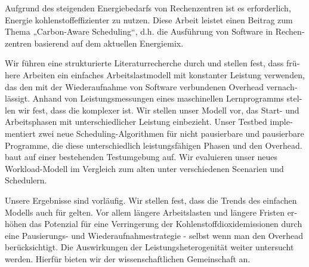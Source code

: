 \null\vfil
\begin{otherlanguage}{ngerman}
\begin{center}\textsf{\textbf{\abstractname}}\end{center}

\noindent 

Aufgrund des steigenden Energiebedarfs von Rechenzentren ist es erforderlich, Energie kohlenstoffeffizienter zu nutzen. Diese Arbeit leistet einen Beitrag zum Thema „Carbon-Aware Scheduling“, d.h. die Ausführung von Software in Rechenzentren basierend auf dem aktuellen Energiemix.

Wir führen eine strukturierte Literaturrecherche durch und stellen fest, dass frühere Arbeiten ein einfaches Arbeitslastmodell mit konstanter Leistung verwenden, das den mit der Wiederaufnahme von Software verbundenen Overhead vernachlässigt.
Anhand von Leistungsmessungen eines maschinellen Lernprogramms stellen wir fest, dass die komplexer ist. Wir stellen unser Modell \modelname{} vor, das Start- und Arbeitsphasen mit unterschiedlicher Leistung einbezieht. Unser Testbed \programname{} implementiert zwei neue Scheduling-Algorithmen für nicht pausierbare und pausierbare Programme, die diese unterschiedlich leistungsfähigen Phasen und den Overhead. \programname{} baut auf einer bestehenden Testumgebung auf. Wir evaluieren unser neues Workload-Modell im Vergleich zum alten unter verschiedenen Scenarien und Schedulern.

Unsere Ergebnisse sind vorläufig. Wir stellen fest, dass die Trends des einfachen Modells auch für \modelname{} gelten. Vor allem längere Arbeitslasten und längere Fristen erhöhen das Potenzial für eine Verringerung der Kohlenstoffdioxidemissionen durch eine Pausierungs- und Wiederaufnahmestrategie - selbst wenn man den Overhead berücksichtigt. Die Auswirkungen der Leistungsheterogenität weiter untersucht werden. Hierfür bieten wir der wissenschaftlichen Gemeinschaft \programname{} an.

\end{otherlanguage}
\vfil\null



